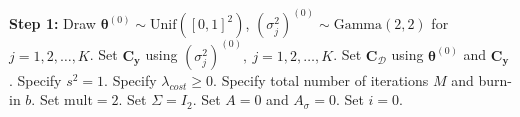 \documentclass{article}
\begin{document}
\begin{appendices}
\begin{algorithm}
%
\textbf{Step 1:} Draw $\boldsymbol \theta^{(0)}\sim \mathrm {Unif}([0,1]^2)$, $(\sigma^2_j)^{(0)} \sim \mathrm {Gamma}(2,2)$ for $j=1,2,\ldots,K$. 
Set $\mathbf C_{\mathbf y}$ using $(\sigma^2_j)^{(0)},\ j=1,2,\ldots,K$.
Set $\mathbf C_{\mathcal D}$ using $\boldsymbol\theta^{(0)}$ and $\mathbf C_{\mathbf y}$.
Specify $s^2=1$. 
Specify $\lambda_{cost}\geq0$. Specify total number of iterations $M$ and burn-in $b$.
Set $\mathrm{mult}=2$.
Set $\Sigma=I_2$.
Set $A=0$ and $A_\sigma=0$.
Set $i=0$.


\end{algorithm}
\end{appendices}
\end{document}
